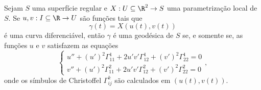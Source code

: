 \begin{prop}
    Sejam \( S \) uma superfície regular e \( X : U \subseteq \R^{ 2 } \to S \) uma parametrização local de \( S \).
    Se \( u, v : I \subseteq \R \to U \) são funções tais que
    \begin{equation*}
        \gamma ( t ) = X ( u ( t ), v ( t ) )
    \end{equation*}
    é uma curva diferenciável, então \( \gamma \) é uma geodésica de \( S \) se, e somente se, as funções \( u \) e \( v \) satisfazem as equações
    \begin{equation}
        \begin{cases}
            u'' + ( u' )^2 \Gamma_{ 11 }^{ 1 } + 2 u'v'\Gamma_{ 12 }^{ 1 } + ( v' )^2 \Gamma_{ 22 }^{ 1 } = 0 \\
            v'' + ( u' )^2 \Gamma_{ 11 }^{ 2 } + 2 u'v'\Gamma_{ 12 }^{ 2 } + ( v' )^2 \Gamma_{ 22 }^{ 2 } = 0
        \end{cases}
        \label{difeq}
    ,\end{equation}
    onde os símbulos de Christoffel \( \Gamma_{ ij }^{ k } \) são calculados em \( ( u ( t ), v ( t ) ) \).
\end{prop}

